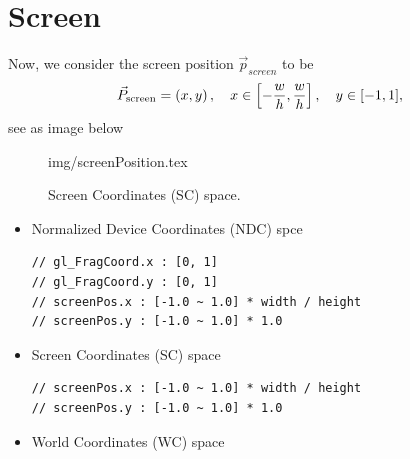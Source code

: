 \documentclass[a4paper, reprint, showkeys, nofootinbib,twoside]{revtex4-1}
\begin{document}
	\section{Screen} \label{sec:screen}
	Now, we consider the screen position $\vec{p}_{screen}$ to be
	\begin{equation}
	\vec{P}_{\rm screen} = \left(x,y\right),\quad x\in \left[-\frac{w}{h}, \frac{w}{h}\right],\quad y\in [-1,1],
	\end{equation}
	see as image below
	
	\begin{figure}[h]
	\centering
		{img/screenPosition.tex}
	\caption{Screen Coordinates (SC) space.}
	\end{figure}
	
	\begin{itemize}
	\item  Normalized Device Coordinates (NDC) spce
		\begin{verbatim}
// gl_FragCoord.x : [0, 1] 
// gl_FragCoord.y : [0, 1] 
// screenPos.x : [-1.0 ~ 1.0] * width / height
// screenPos.y : [-1.0 ~ 1.0] * 1.0
		\end{verbatim}
	\item Screen Coordinates (SC) space
		\begin{verbatim}
// screenPos.x : [-1.0 ~ 1.0] * width / height
// screenPos.y : [-1.0 ~ 1.0] * 1.0
		\end{verbatim}
	\item World Coordinates (WC) space
	\end{itemize}
	


		


	
\end{document}
